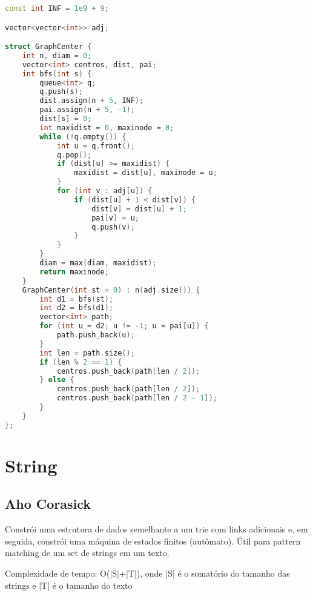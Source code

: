 \documentclass[11pt, a4paper, oneside]{book}
\begin{document}
\hfill

\begin{multicols}{2}
\begin{lstlisting}[language=C++]
const int INF = 1e9 + 9;

vector<vector<int>> adj;

struct GraphCenter {
    int n, diam = 0;
    vector<int> centros, dist, pai;
    int bfs(int s) {
        queue<int> q;
        q.push(s);
        dist.assign(n + 5, INF);
        pai.assign(n + 5, -1);
        dist[s] = 0;
        int maxidist = 0, maxinode = 0;
        while (!q.empty()) {
            int u = q.front();
            q.pop();
            if (dist[u] >= maxidist) {
                maxidist = dist[u], maxinode = u;
            }
            for (int v : adj[u]) {
                if (dist[u] + 1 < dist[v]) {
                    dist[v] = dist[u] + 1;
                    pai[v] = u;
                    q.push(v);
                }
            }
        }
        diam = max(diam, maxidist);
        return maxinode;
    }
    GraphCenter(int st = 0) : n(adj.size()) {
        int d1 = bfs(st);
        int d2 = bfs(d1);
        vector<int> path;
        for (int u = d2; u != -1; u = pai[u]) {
            path.push_back(u);
        }
        int len = path.size();
        if (len % 2 == 1) {
            centros.push_back(path[len / 2]);
        } else {
            centros.push_back(path[len / 2]);
            centros.push_back(path[len / 2 - 1]);
        }
    }
};
\end{lstlisting}
\end{multicols}

\hfill

\newpage

%
%
%
%

\chapter{String}

\section{Aho Corasick}


Constrói uma estrutura de dados semelhante a um trie com links adicionais e, em seguida, constrói uma máquina de estados finitos (autômato). Útil para pattern matching de um set de strings em um texto.



Complexidade de tempo: O(|S|+|T|), onde |S| é o somatório do tamanho das strings e |T| é o tamanho do texto
\end{document}
